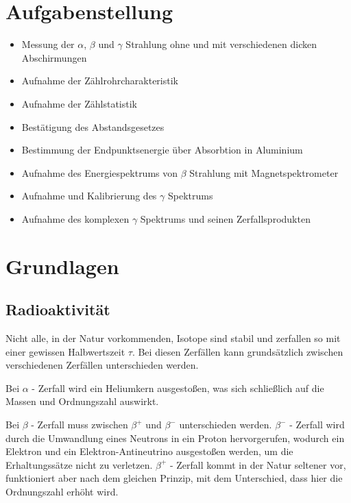 \documentclass[12pt,english,ngerman]{scrartcl}
\begin{document}
%
\tableofcontents
\newpage

\section{Aufgabenstellung\label{Auf}}



\begin{itemize}
    \item Messung der $\alpha$, $\beta$ und $\gamma$ Strahlung ohne und mit verschiedenen dicken Abschirmungen
    \item Aufnahme der Zählrohrcharakteristik
    \item Aufnahme der Zählstatistik
    \item Bestätigung des Abstandsgesetzes
    \item Bestimmung der Endpunktsenergie über Absorbtion in Aluminium
    \item Aufnahme des Energiespektrums von $\beta$ Strahlung mit Magnetspektrometer
    \item Aufnahme und Kalibrierung des $\gamma$ Spektrums
    \item Aufnahme des komplexen $\gamma$ Spektrums und seinen Zerfallsprodukten
\end{itemize}

\section{Grundlagen}\label{Grund}

\subsection{Radioaktivität}
Nicht alle, in der Natur vorkommenden, Isotope sind stabil und zerfallen so mit einer gewissen Halbwertszeit $\tau$.
Bei diesen Zerfällen kann grundsätzlich zwischen verschiedenen Zerfällen unterschieden werden.

Bei $\alpha$ - Zerfall wird ein Heliumkern ausgestoßen, was sich schließlich auf die Massen und Ordnungszahl auswirkt.

Bei $\beta$ - Zerfall muss zwischen $\beta^+$ und $\beta^-$ unterschieden werden.
$\beta^-$ - Zerfall wird durch die Umwandlung eines Neutrons in ein Proton hervorgerufen, wodurch ein Elektron und ein 
Elektron-Antineutrino ausgestoßen werden, um die Erhaltungssätze nicht zu verletzen.
$\beta^+$ - Zerfall kommt in der Natur seltener vor, funktioniert aber nach dem gleichen Prinzip, mit dem Unterschied, 
dass hier die Ordnungszahl erhöht wird.
\end{document}
